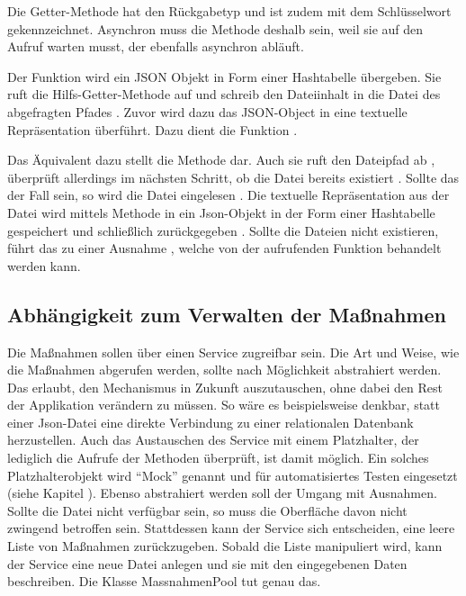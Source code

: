 {Die Getter-Methode  hat den Rückgabetyp  und ist zudem mit dem Schlüsselwort  gekennzeichnet. Asynchron muss die Methode deshalb sein, weil sie auf den Aufruf  warten musst, der ebenfalls asynchron abläuft.

Der Funktion   wird ein JSON Objekt in Form einer Hashtabelle übergeben. Sie ruft die Hilfs-Getter-Methode   auf und schreib den Dateiinhalt in die Datei des abgefragten Pfades . Zuvor wird dazu das JSON-Object in eine textuelle Repräsentation überführt. Dazu dient die Funktion .

Das Äquivalent dazu stellt die Methode   dar. Auch sie ruft den Dateipfad ab , überprüft allerdings im nächsten Schritt, ob die Datei bereits existiert . Sollte das der Fall sein, so wird die Datei eingelesen . Die textuelle Repräsentation aus der Datei wird mittels Methode  in ein Json-Objekt in der Form einer Hashtabelle gespeichert  und schließlich zurückgegeben . Sollte die Dateien nicht existieren, führt das zu einer Ausnahme , welche von der aufrufenden Funktion behandelt werden kann.

\subsection{ Abhängigkeit zum Verwalten der Maßnahmen}

Die Maßnahmen sollen über einen Service zugreifbar sein. Die Art und Weise, wie die Maßnahmen abgerufen werden, sollte nach Möglichkeit abstrahiert werden. Das erlaubt, den Mechanismus in Zukunft auszutauschen, ohne dabei den Rest der Applikation verändern zu müssen. So wäre es beispielsweise denkbar, statt einer Json-Datei eine direkte Verbindung zu einer relationalen Datenbank herzustellen. Auch das Austauschen des Service mit einem Platzhalter, der lediglich die Aufrufe der Methoden überprüft, ist damit möglich. Ein solches Platzhalterobjekt wird \enquote{Mock} genannt und für automatisiertes Testen eingesetzt (siehe Kapitel  ). Ebenso abstrahiert werden soll der Umgang mit Ausnahmen. Sollte die Datei nicht verfügbar sein, so muss die Oberfläche davon nicht zwingend betroffen sein. Stattdessen kann der Service sich entscheiden, eine leere Liste von Maßnahmen zurückzugeben. Sobald die Liste manipuliert wird, kann der Service eine neue Datei anlegen und sie mit den eingegebenen Daten beschreiben. Die Klasse MassnahmenPool \Lst{\ref{lst:Schritt1KlasseMassnahmenPool}} tut genau das. 
 
}
